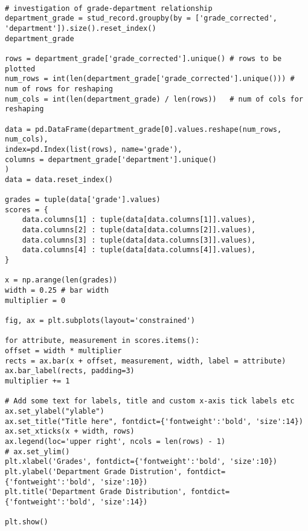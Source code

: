 \label{code:grade_department}
\begin{verbatim}

# investigation of grade-department relationship
department_grade = stud_record.groupby(by = ['grade_corrected', 'department']).size().reset_index()
department_grade

rows = department_grade['grade_corrected'].unique() # rows to be plotted
num_rows = int(len(department_grade['grade_corrected'].unique())) # num of rows for reshaping
num_cols = int(len(department_grade) / len(rows))   # num of cols for reshaping

data = pd.DataFrame(department_grade[0].values.reshape(num_rows, num_cols), 
index=pd.Index(list(rows), name='grade'),
columns = department_grade['department'].unique()
)
data = data.reset_index()

grades = tuple(data['grade'].values)
scores = {
	data.columns[1] : tuple(data[data.columns[1]].values),
	data.columns[2] : tuple(data[data.columns[2]].values),
	data.columns[3] : tuple(data[data.columns[3]].values),
	data.columns[4] : tuple(data[data.columns[4]].values),
}

x = np.arange(len(grades))
width = 0.25 # bar width
multiplier = 0

fig, ax = plt.subplots(layout='constrained')

for attribute, measurement in scores.items():
offset = width * multiplier 
rects = ax.bar(x + offset, measurement, width, label = attribute)
ax.bar_label(rects, padding=3)
multiplier += 1

# Add some text for labels, title and custom x-axis tick labels etc
ax.set_ylabel("ylable")
ax.set_title("Title here", fontdict={'fontweight':'bold', 'size':14})
ax.set_xticks(x + width, rows)
ax.legend(loc='upper right', ncols = len(rows) - 1)
# ax.set_ylim()
plt.xlabel('Grades', fontdict={'fontweight':'bold', 'size':10})
plt.ylabel('Department Grade Distrution', fontdict={'fontweight':'bold', 'size':10})
plt.title('Department Grade Distribution', fontdict={'fontweight':'bold', 'size':14})

plt.show()
\end{verbatim}



